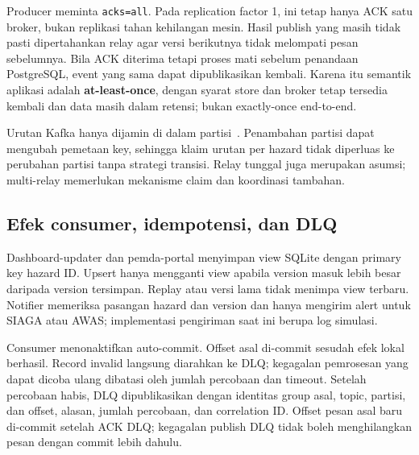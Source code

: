 Producer meminta \texttt{acks=all}. Pada replication factor 1, ini tetap hanya ACK satu broker, bukan replikasi tahan kehilangan mesin. Hasil publish yang masih tidak pasti dipertahankan relay agar versi berikutnya tidak melompati pesan sebelumnya. Bila ACK diterima tetapi proses mati sebelum penandaan PostgreSQL, event yang sama dapat dipublikasikan kembali. Karena itu semantik aplikasi adalah \textbf{at-least-once}, dengan syarat store dan broker tetap tersedia kembali dan data masih dalam retensi; bukan exactly-once end-to-end.

Urutan Kafka hanya dijamin di dalam partisi~\cite{kafka-semantics}. Penambahan partisi dapat mengubah pemetaan key, sehingga klaim urutan per hazard tidak diperluas ke perubahan partisi tanpa strategi transisi. Relay tunggal juga merupakan asumsi; multi-relay memerlukan mekanisme claim dan koordinasi tambahan.

\subsection{Efek consumer, idempotensi, dan DLQ}
Dashboard-updater dan pemda-portal menyimpan view SQLite dengan primary key hazard ID. Upsert hanya mengganti view apabila version masuk lebih besar daripada version tersimpan. Replay atau versi lama tidak menimpa view terbaru. Notifier memeriksa pasangan hazard dan version dan hanya mengirim alert untuk SIAGA atau AWAS; implementasi pengiriman saat ini berupa log simulasi.



Consumer menonaktifkan auto-commit. Offset asal di-commit sesudah efek lokal berhasil. Record invalid langsung diarahkan ke DLQ; kegagalan pemrosesan yang dapat dicoba ulang dibatasi oleh jumlah percobaan dan timeout. Setelah percobaan habis, DLQ dipublikasikan dengan identitas group asal, topic, partisi, dan offset, alasan, jumlah percobaan, dan correlation ID. Offset pesan asal baru di-commit setelah ACK DLQ; kegagalan publish DLQ tidak boleh menghilangkan pesan dengan commit lebih dahulu.

